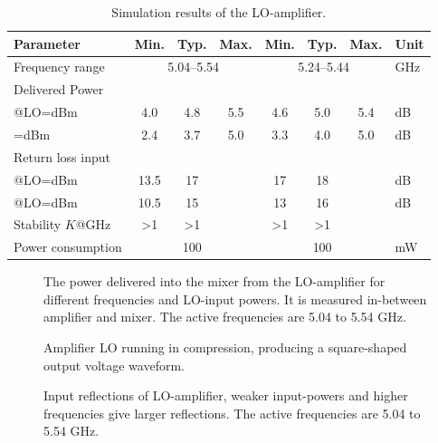			\begin{table}[hbt!]
				\caption[Simulation results of the LO-amplifier.]{Simulation results of the LO-amplifier.\disclaimer}
				\label{tab:resultlo}
				\centering
				\begin{tabular}{ l c c c c c c l } \toprule
					Parameter & Min. & Typ. & Max. & Min. & Typ. & Max. & Unit \\\midrule
					Frequency range & \multicolumn{3}{c}{5.04--5.54} & \multicolumn{3}{c}{5.24--5.44} & GHz \\
					Delivered Power & & & & & & \\
						\qquad @LO=\unit[-2--0]{dBm} 		& 4.0 & 4.8 & 5.5 & 4.6 & 5.0 & 5.4 & dB \\
						\qquad@LO=\unit[-4-- -2]{dBm} 		& 2.4 & 3.7 & 5.0 & 3.3 & 4.0 & 5.0 & dB \\
					Return loss input  & & & & & & \\
						\qquad @LO=\unit[-2--0]{dBm} 	& 13.5 & 17 & & 17 & 18 & & dB \\
						\qquad @LO=\unit[-4-- -2]{dBm} 	& 10.5 & 15 & & 13 & 16 & & dB \\
					Stability $K$@\unit[0--80]{GHz} & >1 & >1 &  & >1 & >1 &  & \\
					Power consumption &  & 100 &  & & 100 & & mW  \\\bottomrule
				\end{tabular}
			\end{table}

			\begin{figure}[hbt!]
				\centering
				\caption[Output power from LO-amplifier]{The power delivered into the mixer from the LO-amplifier for different frequencies and LO-input powers. It is measured in-between amplifier and mixer. The active frequencies are 5.04 to 5.54 GHz.}\label{fig:lo_delivered_power}
			\end{figure}
			\begin{figure}[hbt!]
				\centering
				\caption[Amplifier LO waveform]{Amplifier LO running in compression, producing a square-shaped output voltage waveform.}\label{fig:lo_waveform}
			\end{figure}

			\begin{figure}[hbt!]
				\centering
				\caption[Input reflections of LO-amplifier]{Input reflections of LO-amplifier, weaker input-powers and higher frequencies give larger reflections. The active frequencies are 5.04 to 5.54 GHz.}\label{fig:lo_reflections}
			\end{figure}



